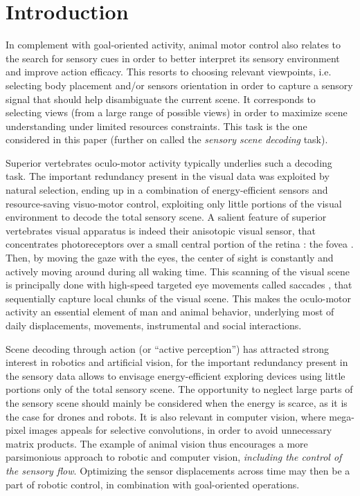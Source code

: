 \documentclass[12pt,twoside,openright]{article}
\begin{document}
\section{Introduction}

In complement with goal-oriented activity, animal motor control also relates to the search for sensory cues in order to better interpret its sensory environment and improve action efficacy. This resorts to choosing relevant viewpoints, i.e. selecting body placement and/or sensors orientation in order to capture a sensory signal that should help disambiguate the current scene. It corresponds to selecting views (from a large range of possible views) in order to maximize scene understanding under limited resources constraints. This task is the one considered in this paper (further on called the \emph{sensory scene decoding} task). 

Superior vertebrates oculo-motor activity typically underlies such a decoding task. The important redundancy present in the visual data was exploited by natural selection, ending up in a combination of energy-efficient sensors and resource-saving visuo-motor control, exploiting only little portions of the visual environment to decode the total sensory scene. A salient feature of superior vertebrates visual apparatus is indeed their anisotopic visual sensor, that concentrates  photoreceptors over a small central portion of the retina : the fovea \citep{osterberg1935topography}. Then, by moving the gaze with the eyes, the center of sight is constantly and actively moving around during all waking time. 
This scanning of the visual scene is principally done with high-speed targeted eye movements called saccades \citep{yarbus1967eye}, that sequentially capture local chunks of the visual scene. This makes the oculo-motor activity an essential element of man and animal behavior, underlying most of daily displacements, movements, instrumental and social interactions. 

Scene decoding through action (or ``active perception'') has attracted strong interest in robotics and artificial vision, for the important redundancy present in the sensory data allows to envisage energy-efficient  exploring devices using  little portions only of the total sensory scene.
The opportunity to neglect large parts of the sensory scene should mainly be considered when the energy is scarce, as it is the case for drones and robots. 
It is also relevant in computer vision, where mega-pixel images appeals for selective convolutions, in order to avoid unnecessary matrix products. 
The example of animal vision thus encourages a more parsimonious approach to robotic and computer vision, \emph{including the control of the sensory flow}. 
Optimizing the sensor displacements across time may then be a part of robotic control, in combination with goal-oriented operations. 
\end{document}
